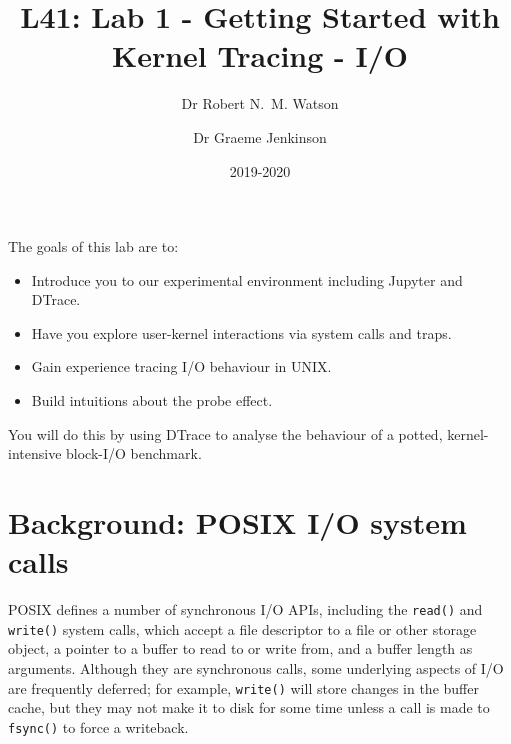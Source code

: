 \documentclass[a4paper,10pt]{article}
\newcommand{\code}[1]{\texttt{\small #1}}
\begin{document}
\title{L41: Lab 1 - Getting Started with Kernel Tracing - I/O}
\author{Dr Robert N.~M. Watson \and Dr Graeme Jenkinson}
\date{2019-2020}
\maketitle

%
%
%

\noindent
The goals of this lab are to:

\begin{itemize}
\item Introduce you to our experimental environment including Jupyter and
  DTrace.
\item Have you explore user-kernel interactions via system calls and traps.
\item Gain experience tracing I/O behaviour in UNIX.
\item Build intuitions about the probe effect.
\end{itemize}

\noindent
You will do this by using DTrace to analyse the behaviour of a potted,
kernel-intensive block-I/O benchmark.


\section*{Background: POSIX I/O system calls}

POSIX defines a number of synchronous I/O APIs, including the
\code{read()} and \code{write()} system calls, which accept a file
descriptor to a file or other storage object, a pointer to a buffer to read to
or write from, and a buffer length as arguments.
Although they are synchronous calls, some underlying aspects of I/O are
frequently deferred; for example, \code{write()} will store changes in the
buffer cache, but they may not make it to disk for some time unless a call is
made to \code{fsync()} to force a writeback.
\end{document}
